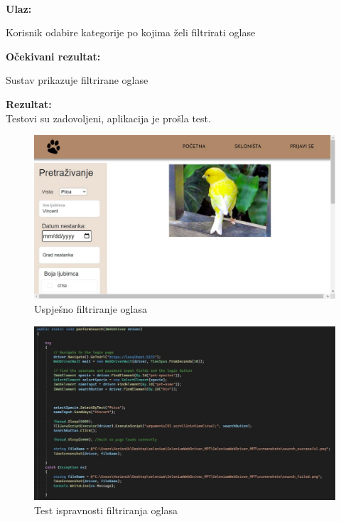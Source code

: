 			\noindent {}\\
			\textbf{Ulaz: }	
			\begin{packed_enum}
				\item Korisnik odabire kategorije po kojima želi filtrirati oglase
				
			\end{packed_enum}
			
			\noindent \textbf{Očekivani rezultat:}
			
			\begin{packed_enum}
				\item Sustav prikazuje filtrirane oglase
				
			\end{packed_enum}
			
			\noindent \textbf{Rezultat:}\\
			Testovi su zadovoljeni, aplikacija je prošla test.\\
			\begin{figure}[H]
				\includegraphics[width=\textwidth]{uspjesan_filter.JPEG}
				\centering
				\caption{Uspješno filtriranje oglasa}
				\label{fig:uspjesanfilter}
			\end{figure}
			\begin{figure}[H]
				\includegraphics[width=\textwidth]{2test_filter.JPEG}
				\centering
				\caption{Test ispravnosti filtriranja oglasa}
				\label{fig:testfilter}
			\end{figure}
			
